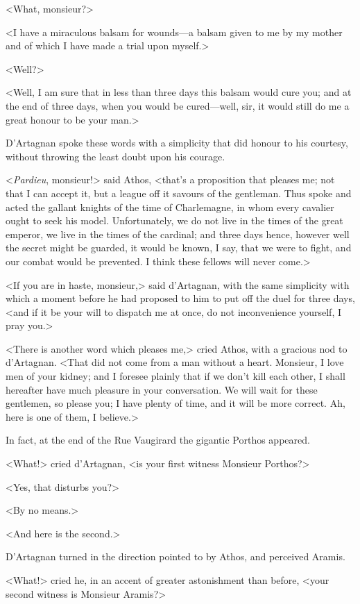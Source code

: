 <What, monsieur?> 

<I have a miraculous balsam for wounds---a balsam given to me by my mother and of which I have made a trial upon myself.> 

<Well?> 

<Well, I am sure that in less than three days this balsam would cure you; and at the end of three days, when you would be cured---well, sir, it would still do me a great honour to be your man.> 

D'Artagnan spoke these words with a simplicity that did honour to his courtesy, without throwing the least doubt upon his courage. 

<\textit{Pardieu}, monsieur!> said Athos, <that's a proposition that pleases me; not that I can accept it, but a league off it savours of the gentleman. Thus spoke and acted the gallant knights of the time of Charlemagne, in whom every cavalier ought to seek his model. Unfortunately, we do not live in the times of the great emperor, we live in the times of the cardinal; and three days hence, however well the secret might be guarded, it would be known, I say, that we were to fight, and our combat would be prevented. I think these fellows will never come.> 

<If you are in haste, monsieur,> said d'Artagnan, with the same simplicity with which a moment before he had proposed to him to put off the duel for three days, <and if it be your will to dispatch me at once, do not inconvenience yourself, I pray you.> 

<There is another word which pleases me,> cried Athos, with a gracious nod to d'Artagnan. <That did not come from a man without a heart. Monsieur, I love men of your kidney; and I foresee plainly that if we don't kill each other, I shall hereafter have much pleasure in your conversation. We will wait for these gentlemen, so please you; I have plenty of time, and it will be more correct. Ah, here is one of them, I believe.> 

In fact, at the end of the Rue Vaugirard the gigantic Porthos appeared. 

<What!> cried d'Artagnan, <is your first witness Monsieur Porthos?> 

<Yes, that disturbs you?> 

<By no means.> 

<And here is the second.> 

D'Artagnan turned in the direction pointed to by Athos, and perceived Aramis. 

<What!> cried he, in an accent of greater astonishment than before, <your second witness is Monsieur Aramis?> 

